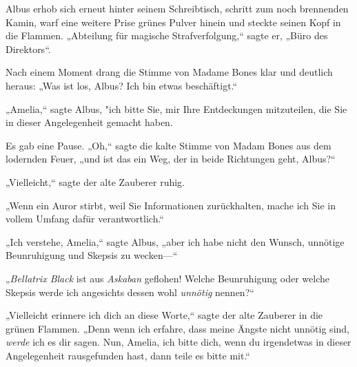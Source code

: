 Albus erhob sich erneut hinter seinem Schreibtisch, schritt zum noch brennenden Kamin, warf eine weitere Prise grünes Pulver hinein und steckte seinen Kopf in die Flammen. „Abteilung für magische Strafverfolgung,“ sagte er, „Büro des Direktors“.

Nach einem Moment drang die Stimme von Madame Bones klar und deutlich heraus: „Was ist los, Albus? Ich bin etwas beschäftigt.“

„Amelia,“ sagte Albus, "ich bitte Sie, mir Ihre Entdeckungen mitzuteilen, die Sie in dieser Angelegenheit gemacht haben.

Es gab eine Pause. „Oh,“ sagte die kalte Stimme von Madam Bones aus dem lodernden Feuer, „und ist das ein Weg, der in beide Richtungen geht, Albus?“

„Vielleicht,“ sagte der alte Zauberer ruhig.

„Wenn ein Auror stirbt, weil Sie Informationen zurückhalten, mache ich Sie in vollem Umfang dafür verantwortlich.“

„Ich verstehe, Amelia,“ sagte Albus, „aber ich habe nicht den Wunsch, unnötige Beunruhigung und Skepsis zu wecken—“

„\emph{Bellatrix Black} ist aus \emph{Askaban} geflohen! Welche Beunruhigung oder welche Skepsis werde ich angesichts dessen wohl \emph{unnötig} nennen?“

„Vielleicht erinnere ich dich an diese Worte,“ sagte der alte Zauberer in die grünen Flammen. „Denn wenn ich erfahre, dass meine Ängste nicht unnötig sind, \emph{werde} ich es dir sagen. Nun, Amelia, ich bitte dich, wenn du irgendetwas in dieser Angelegenheit rausgefunden hast, dann teile es bitte mit.“

